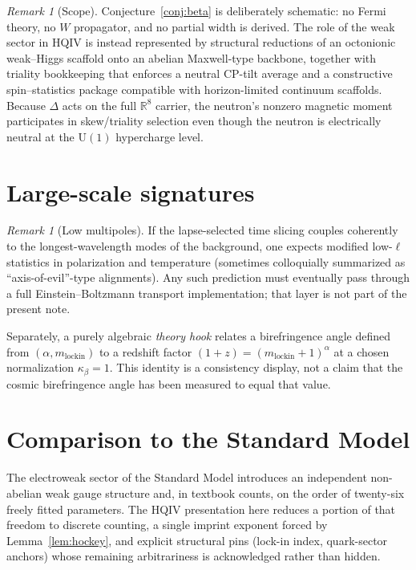 \documentclass[11pt,a4paper]{article}
\theoremstyle{plain}
\theoremstyle{definition}
\theoremstyle{remark}
\newtheorem{remark}[theorem]{Remark}
\theoremstyle{plain}
\theoremstyle{definition}
\begin{document}
\begin{remark}[Scope]
Conjecture~\ref{conj:beta} is deliberately schematic: no Fermi theory, no $W$ propagator, and no partial width is derived.
The role of the weak sector in HQIV is instead represented by structural reductions of an octonionic weak--Higgs scaffold onto an abelian Maxwell-type backbone, together with triality bookkeeping that enforces a neutral CP-tilt average and a constructive spin--statistics package compatible with horizon-limited continuum scaffolds.
Because $\Delta$ acts on the full $\mathbb{R}^8$ carrier, the neutron's nonzero magnetic moment participates in skew/triality selection even though the neutron is electrically neutral at the $\mathrm{U}(1)$ hypercharge level.
\end{remark}

\section{Large-scale signatures}

\begin{remark}[Low multipoles]
If the lapse-selected time slicing couples coherently to the longest-wavelength modes of the background, one expects modified low-$\ell$ statistics in polarization and temperature (sometimes colloquially summarized as ``axis-of-evil''-type alignments).
Any such prediction must eventually pass through a full Einstein--Boltzmann transport implementation; that layer is not part of the present note.

Separately, a purely algebraic \emph{theory hook} relates a birefringence angle defined from $(\alpha,m_{\mathrm{lockin}})$ to a redshift factor $(1+z)=(m_{\mathrm{lockin}}+1)^{\alpha}$ at a chosen normalization $\kappa_{\beta}=1$.
This identity is a consistency display, not a claim that the cosmic birefringence angle has been measured to equal that value.
\end{remark}

\section{Comparison to the Standard Model}

The electroweak sector of the Standard Model introduces an independent non-abelian weak gauge structure and, in textbook counts, on the order of twenty-six freely fitted parameters.
The HQIV presentation here reduces a portion of that freedom to discrete counting, a single imprint exponent forced by Lemma~\ref{lem:hockey}, and explicit structural pins (lock-in index, quark-sector anchors) whose remaining arbitrariness is acknowledged rather than hidden.
\end{document}
